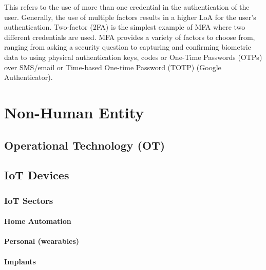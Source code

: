 This refers to the use of more than one credential in the authentication
of the user. Generally, the use of multiple factors results in a higher
LoA for the user's authentication. Two-factor (2FA) is the simplest
example of MFA where two different credentials are used. MFA provides a
variety of factors to choose from, ranging from asking a security
question to capturing and confirming biometric data to using physical
authentication keys, codes or One-Time Passwords (OTPs) over SMS/email
or Time-based One-time Password (TOTP) (Google Authenticator).~

\hypertarget{non-human-entity}{%
\chapter{Non-Human Entity}\label{non-human-entity}}

\hypertarget{operational-technology-ot}{%
\section{Operational Technology
(OT)}\label{operational-technology-ot}}

\hypertarget{iot-devices}{%
\section{IoT Devices}\label{iot-devices}}

\hypertarget{iot-sectors}{%
\subsection{IoT Sectors}\label{iot-sectors}}

\hypertarget{home-automation}{%
\subsubsection{Home Automation}\label{home-automation}}

\hypertarget{personal-wearables}{%
\subsubsection{Personal (wearables)}\label{personal-wearables}}

\hypertarget{implants}{%
\subsubsection{Implants}\label{implants}}

